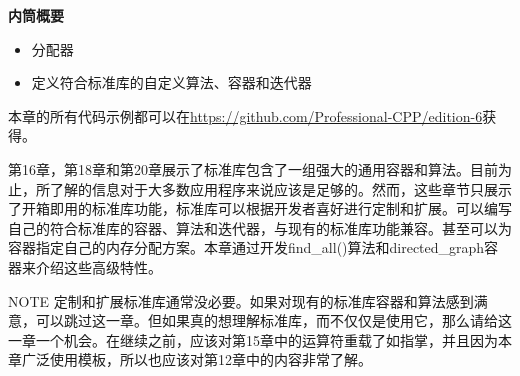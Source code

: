 \noindent
\textbf{内筒概要}

\begin{itemize}
\item
分配器

\item
定义符合标准库的自定义算法、容器和迭代器
\end{itemize}

本章的所有代码示例都可以在\url{https://github.com/Professional-CPP/edition-6}获得。

第16章，第18章和第20章展示了标准库包含了一组强大的通用容器和算法。目前为止，所了解的信息对于大多数应用程序来说应该是足够的。然而，这些章节只展示了开箱即用的标准库功能，标准库可以根据开发者喜好进行定制和扩展。可以编写自己的符合标准库的容器、算法和迭代器，与现有的标准库功能兼容。甚至可以为容器指定自己的内存分配方案。本章通过开发find\_all()算法和directed\_graph容器来介绍这些高级特性。

\begin{myNotic}{NOTE}
定制和扩展标准库通常没必要。如果对现有的标准库容器和算法感到满意，可以跳过这一章。但如果真的想理解标准库，而不仅仅是使用它，那么请给这一章一个机会。在继续之前，应该对第15章中的运算符重载了如指掌，并且因为本章广泛使用模板，所以也应该对第12章中的内容非常了解。
\end{myNotic}


